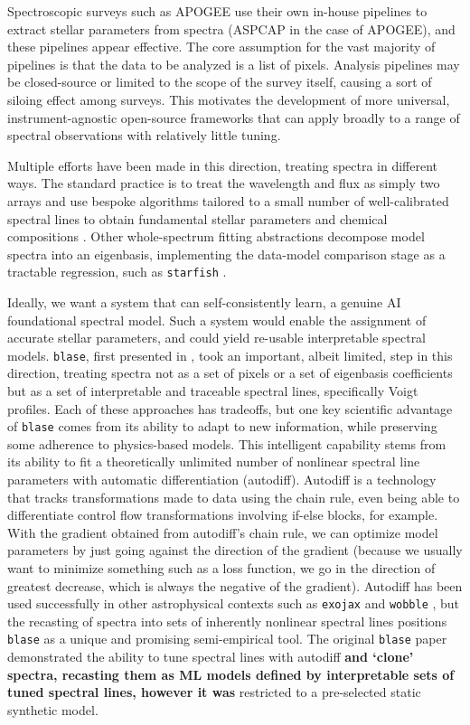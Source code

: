\documentclass[twocolumn, linenumbers]{aastex631}
\begin{document}
Spectroscopic surveys such as APOGEE \textbf{\citep{APOGEE}} use their own in-house pipelines to extract stellar parameters from spectra (ASPCAP \textbf{\citep{ASPCAP}} in the case of APOGEE), and these pipelines appear effective.
The core assumption for the vast majority of pipelines is that the data to be analyzed is a list of pixels.
Analysis pipelines may be closed-source or limited to the scope of the survey itself, causing a sort of siloing effect among surveys.
This motivates the development of more universal, instrument-agnostic open-source frameworks that can apply broadly to a range of spectral observations with relatively little tuning.

Multiple efforts have been made in this direction, treating spectra in different ways.
The standard practice is to treat the wavelength and flux as simply two arrays and use bespoke algorithms tailored to a small number of well-calibrated spectral lines to obtain fundamental stellar parameters and chemical compositions \citep{pipeline1, pipeline2}.
Other whole-spectrum fitting abstractions decompose model spectra into an eigenbasis, implementing the data-model comparison stage as a tractable regression, such as \texttt{starfish} \citep{starfish}.

Ideally, we want a system that can self-consistently learn, a genuine AI foundational spectral model.
Such a system would enable the assignment of accurate stellar parameters, and could yield re-usable interpretable spectral models.
\texttt{blase}, first presented in \citealt{blase}, took an important, albeit limited, step in this direction, treating spectra not as a set of pixels or a set of eigenbasis coefficients but as a set of interpretable and traceable spectral lines, specifically Voigt profiles.
Each of these approaches has tradeoffs, but one key scientific advantage of \texttt{blase} comes from its ability to adapt to new information, while preserving some adherence to physics-based models.
This intelligent capability stems from its ability to fit a theoretically unlimited number of nonlinear spectral line parameters with automatic differentiation (autodiff).
Autodiff is a technology that tracks transformations made to data using the chain rule, even being able to differentiate control flow transformations involving if-else blocks, for example.
With the gradient obtained from autodiff's chain rule, we can optimize model parameters by just going against the direction of the gradient (because we usually want to minimize something such as a loss function, we go in the direction of greatest decrease, which is always the negative of the gradient).
Autodiff has been used successfully in other astrophysical contexts such as \texttt{exojax} \textbf{\citep{exojax}} and \texttt{wobble} \citep{wobble}, but the recasting of spectra into sets of inherently nonlinear spectral lines positions \texttt{blase} as a unique and promising semi-empirical tool.
The original \texttt{blase} paper demonstrated the ability to tune spectral lines with autodiff \textbf{and `clone' spectra, recasting them as ML models defined by interpretable sets of tuned spectral lines, however it was} restricted to a pre-selected static synthetic model.
\end{document}
